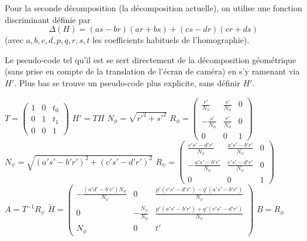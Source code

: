 \documentclass[a4paper,11pt]{article}
\newcommand{\pmatrice}[1]{\begin{pmatrix} #1 \end{pmatrix}}
\newenvironment{algorithme}{\begin{algorithm}[H]}{\end{algorithm}}
\begin{document}
  Pour la seconde décomposition (la décomposition actuelle), on utilise une fonction discriminant définie par
  \[\Delta(H) = (as-br)(ar+bs)+(cs-dr)(cr+ds)\]
  (avec $a,b,c,d,p,q,r,s,t$ les coefficients habituels de l'homographie).
  
  Le pseudo-code tel qu'il est se sert directement de la décomposition géométrique (sans prise en compte de la translation de l'écran de caméra) en s'y ramenant via $H'$. Plus bas se trouve un pseudo-code plus explicite, sans définir $H'$.
  
    \begin{algorithme}
     \caption{$decomposition(H)$}
     $T = \pmatrice{1&0&t_0\\0&1&t_1\\0&0&1}$\;
     $H' = TH$\;
     $N_\phi = \sqrt{r'^2+s'^2}$\;
     $R_\phi = \pmatrice{
      \frac{r'}{N_\phi} & \frac{s'}{N_\phi} & 0\\
      -\frac{s'}{N_\phi} & \frac{r'}{N_\phi} & 0\\
      0 & 0 & 1}$\;
     $N_\psi = \sqrt{(a's'-b'r')^2+(c's'-d'r')^2}$\;
     $R_\psi = \pmatrice{
      \frac{c's'-d'r'}{N_\psi} & \frac{a's'-b'r'}{N_\psi} & 0\\
      -\frac{a's'-b'r'}{N_\psi} & \frac{c's'-d'r'}{N_\psi} & 0\\
      0 & 0 & 1}$\;
     $A = T^{-1}R_\psi$\;
     $\tilde H = \pmatrice{
      -\frac{(a'd'-b'c')N_\phi}{N_\psi} & 0 & \frac{p'(c's'-d'r')-q'(a's'-b'r')}{N_\psi}\\
      0 & -\frac{N_\psi}{N_\phi} & \frac{p'(a's'-b'r')+q'(c's'-d'r')}{N_\psi}\\
      N_\phi & 0 & t'}$\;
     $B = R_\phi$\;
   \end{algorithme}
\end{document}
